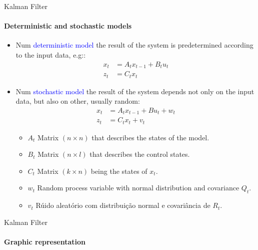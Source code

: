 \documentclass[aspectratio=169]{beamer}
\begin{document}
\begin{frame}{Kalman Filter}
    \framesubtitle{Deterministic and stochastic models}
    \begin{itemize}
        \item Num \textcolor{blue}{deterministic model} the result of the system is predetermined according to the input data, e.g::
        \begin{align*} 
            x_t &= A_t x_{t-1} + B_t u_t\\ 
            z_t &= C_t x_t
        \end{align*}
        \item Num \textcolor{blue}{stochastic model} the result of the system depends not only on the input data, but also on other, usually random:
        \begin{align} 
            x_t &= A_t x_{t-1} + B u_t +  w_t\\ 
            z_t &= C_t x_t + v_t
        \end{align}
        \begin{itemize}
             \item $A_t$ Matrix $(n \times n)$ that describes the states of the model.
             \item $B_t$ Matrix $(n \times l)$ that describes the control states.
             \item $C_t$ Matrix $(k\times n)$ being the states of $x_t$.
             \item $ w_t$ Random process variable with normal distribution and covariance $Q_t$.
            \item $v_t$ Rúido aleatório com distribuição normal e covariância de $R_t$.
        \end{itemize}
    \end{itemize}
\end{frame}

\begin{frame}{Kalman Filter}
    \framesubtitle{Graphic representation}
    
\end{frame}
\end{document}
